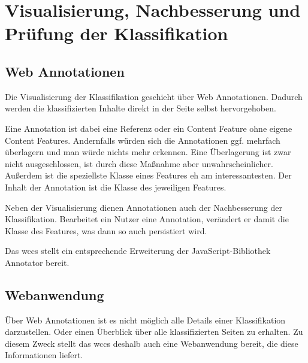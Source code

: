 \section{Visualisierung, Nachbesserung und Prüfung der Klassifikation}
    \label{section:conceptVisualization}

    \subsection{Web Annotationen}
        \label{section:conceptWebAnnotations}
        Die Visualisierung der Klassifikation geschieht über Web Annotationen.
        Dadurch werden die klassifizierten Inhalte direkt in der Seite selbst hervorgehoben.

        Eine Annotation ist dabei eine Referenz oder ein Content Feature ohne eigene Content Features.
        Andernfalls würden sich die Annotationen ggf. mehrfach überlagern und man würde nichts mehr erkennen.
        Eine Überlagerung ist zwar nicht ausgeschlossen, ist durch diese Maßnahme aber unwahrscheinlicher.
        Außerdem ist die speziellste Klasse eines Features eh am interessantesten.
        Der Inhalt der Annotation ist die Klasse des jeweiligen Features.

        Neben der Visualisierung dienen Annotationen auch der Nachbesserung der Klassifikation.
        Bearbeitet ein Nutzer eine Annotation, verändert er damit die Klasse des Features,
        was dann so auch persistiert wird.

        Das \gls{wccs} stellt ein entsprechende Erweiterung der JavaScript-Bibliothek Annotator bereit.

    
    \subsection{Webanwendung}
        Über Web Annotationen ist es nicht möglich alle Details einer Klassifikation darzustellen.
        Oder einen Überblick über alle klassifizierten Seiten zu erhalten.
        Zu diesem Zweck stellt das \gls{wccs} deshalb auch eine Webanwendung bereit,
        die diese Informationen liefert.

